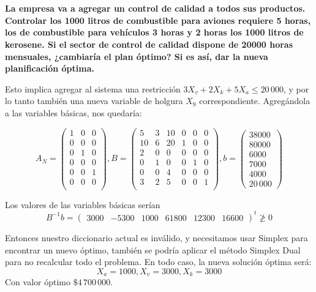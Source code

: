 \documentclass[10pt,a4paper]{article}
\begin{document}
		\section{} %
		
		\textbf{La empresa va a agregar un control de calidad a todos sus productos. Controlar los 1000 litros de combustible para aviones requiere 5 horas, los de combustible para vehículos 3 horas y 2 horas los 1000 litros de kerosene. Si el sector de control de calidad dispone de 20000 horas mensuales, ¿cambiaría el plan óptimo? Si es así, dar la nueva planificación óptima.}
		
		\vspace{5mm}
		
		Esto implica agregar al sistema una restricción $3X_v + 2X_k + 5X_a \leq 20\,000$, y por lo tanto también una nueva variable de holgura $X_9$ correspondiente. Agregándola a las variables básicas, nos quedaría:
		
		\[
		A_N = \begin{pmatrix}
			1 & 0 & 0 \\
			0 & 0 & 0 \\
			0 & 1 & 0 \\
			0 & 0 & 0 \\
			0 & 0 & 1 \\
			0 & 0 & 0 \\
		\end{pmatrix},
		B = \begin{pmatrix}
			5  & 3 & 10 & 0 & 0 & 0\\
			10 & 6 & 20 & 1 & 0 & 0\\
			2  & 0 & 0  & 0 & 0 & 0\\
			0  & 1 & 0  & 0 & 1 & 0\\
			0  & 0 & 4  & 0 & 0 & 0\\
			3  & 2 & 5  & 0 & 0 & 1\\
		\end{pmatrix},
		b = \begin{pmatrix}
			38000 \\
			80000 \\
			6000 \\
			7000 \\
			4000 \\
			20\,000
		\end{pmatrix}
		\]
		
		Los valores de las variables básicas serían
		\[
		B^{-1} b = \begin{pmatrix}
			3000 & -5300 & 1000 & 61800 & 12300 & 16600
		\end{pmatrix}^t \ngeq 0
		\]
		
		Entonces nuestro diccionario actual es inválido, y necesitamos usar Simplex para encontrar un nuevo óptimo, también se podría aplicar el método Simplex Dual para no recalcular todo el problema. En todo caso, la nueva solución óptima será: $$X_a = 1000, X_v = 3000, X_k = 3000$$
		Con valor óptimo $\$4\,700\,000$.
	
\end{document}
